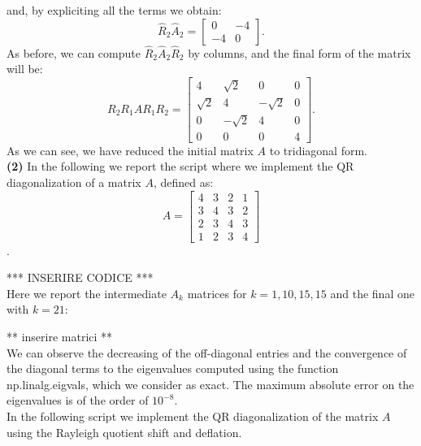 \documentclass[a4paper,11pt]{article}
\begin{document}
and, by expliciting all the terms we obtain:
\begin{equation}\label{key}
	\hat{R}_2 \hat{A}_2 = \left[ \begin{array}{cc}
		0 & -4 \\
		-4 & 0
	\end{array}\right].
\end{equation}
As before, we can compute $\hat{R}_2 \hat{A}_2 \hat{R}_2$ by columns, and the final form of the matrix will be:
\begin{equation}\label{key}
	R_2R_1AR_1R_2 =\begin{bmatrix}
		4& \sqrt{2} & 0  &  0\\
		\sqrt{2}&4 & -\sqrt{2} & 0\\
		0 & -\sqrt{2} & 4  & 0 \\
		0 & 0 & 0 & 4
	\end{bmatrix}.
\end{equation}
As we can see, we have reduced the initial matrix $A$ to tridiagonal form.\\

\noindent \textbf{(2)} In the following we report the script where we implement the QR diagonalization of a matrix $A$, defined as:
\begin{equation}
	A = \begin{bmatrix}
		4 & 3 & 2 & 1 \\
		3 & 4 & 3 & 2 \\
		2 & 3 & 4 & 3 \\
		1 & 2 & 3 & 4
	\end{bmatrix}
\end{equation}.

*** INSERIRE CODICE ***\\

\noindent Here we report the intermediate $A_k$ matrices for $k = 1, 10, 15, 15$ and the final one with $k = 21$:

** inserire matrici **\\

\noindent We can observe the decreasing of the off-diagonal entries and the convergence of the diagonal terms to the eigenvalues computed using the function np.linalg.eigvals, which we consider as exact. The maximum absolute error on the eigenvalues is of the order of $10^{-8}$.\\

\noindent In the following script we implement the QR diagonalization of the matrix $A$ using the Rayleigh quotient shift and deflation. \\
\end{document}
